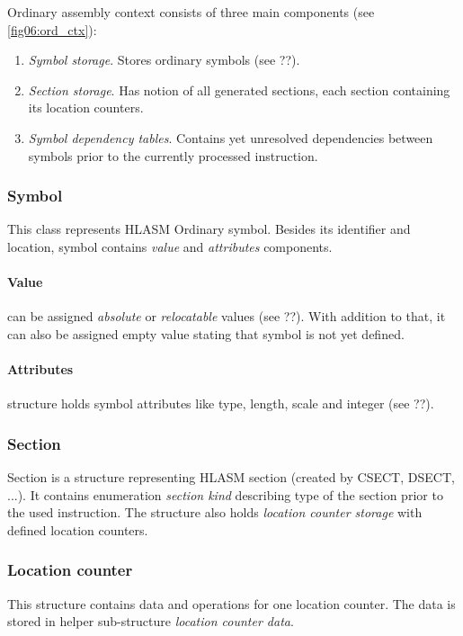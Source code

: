 Ordinary assembly context consists of three main components (see \cref{fig06:ord_ctx}):
\begin{enumerate}
	\item \emph{Symbol storage}. Stores ordinary symbols (see ??).
	\item \emph{Section storage}. Has notion of all generated sections, each section containing its location counters.
	\item \emph{Symbol dependency tables}. Contains yet unresolved dependencies between symbols prior to the currently processed instruction.
\end{enumerate}

\subsubsection{Symbol}

This class represents HLASM Ordinary symbol. Besides its identifier and location, symbol contains \emph{value} and \emph{attributes} components.

\paragraph*{Value} can be assigned \emph{absolute} or \emph{relocatable} values (see ??). With addition to that, it can also be assigned empty value stating that symbol is not yet defined.

\paragraph*{Attributes} structure holds symbol attributes like type, length, scale and integer (see ??).

\subsubsection{Section}

Section is a structure representing HLASM section (created by CSECT, DSECT, ...). It contains enumeration \emph{section kind} describing type of the section prior to the used instruction. The structure also holds \emph{location counter storage} with defined location counters.

\subsubsection{Location counter}

This structure contains data and operations for one location counter. The data is stored in helper sub-structure \emph{location counter data}.

